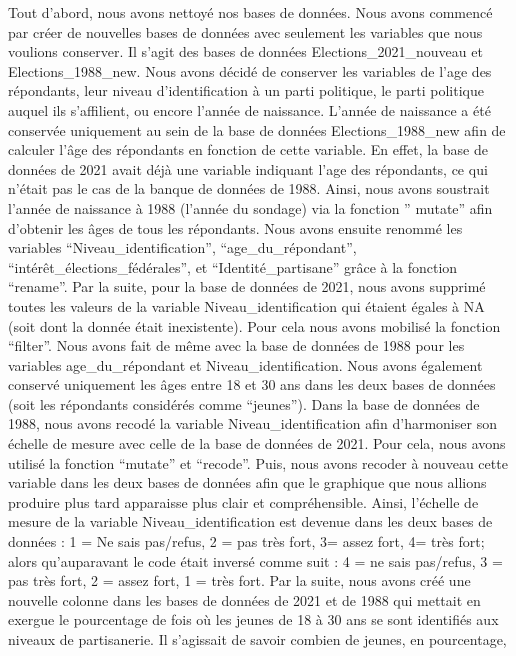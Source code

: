 \documentclass[
  letterpaper,
  DIV=11,
  numbers=noendperiod]{scrartcl}
\begin{document}
Tout d'abord, nous avons nettoyé nos bases de données. Nous avons
commencé par créer de nouvelles bases de données avec seulement les
variables que nous voulions conserver. Il s'agit des bases de données
Elections\_2021\_nouveau et Elections\_1988\_new. Nous avons décidé de
conserver les variables de l'age des répondants, leur niveau
d'identification à un parti politique, le parti politique auquel ils
s'affilient, ou encore l'année de naissance. L'année de naissance a été
conservée uniquement au sein de la base de données Elections\_1988\_new
afin de calculer l'âge des répondants en fonction de cette variable. En
effet, la base de données de 2021 avait déjà une variable indiquant
l'age des répondants, ce qui n'était pas le cas de la banque de données
de 1988. Ainsi, nous avons soustrait l'année de naissance à 1988
(l'année du sondage) via la fonction '' mutate'' afin d'obtenir les âges
de tous les répondants. Nous avons ensuite renommé les variables
``Niveau\_identification'', ``age\_du\_répondant'',
``intérêt\_élections\_fédérales'', et ``Identité\_partisane'' grâce à la
fonction ``rename''. Par la suite, pour la base de données de 2021, nous
avons supprimé toutes les valeurs de la variable Niveau\_identification
qui étaient égales à NA (soit dont la donnée était inexistente). Pour
cela nous avons mobilisé la fonction ``filter''. Nous avons fait de même
avec la base de données de 1988 pour les variables age\_du\_répondant et
Niveau\_identification. Nous avons également conservé uniquement les
âges entre 18 et 30 ans dans les deux bases de données (soit les
répondants considérés comme ``jeunes''). Dans la base de données de
1988, nous avons recodé la variable Niveau\_identification afin
d'harmoniser son échelle de mesure avec celle de la base de données de
2021. Pour cela, nous avons utilisé la fonction ``mutate'' et
``recode''. Puis, nous avons recoder à nouveau cette variable dans les
deux bases de données afin que le graphique que nous allions produire
plus tard apparaisse plus clair et compréhensible. Ainsi, l'échelle de
mesure de la variable Niveau\_identification est devenue dans les deux
bases de données : 1 = Ne sais pas/refus, 2 = pas très fort, 3= assez
fort, 4= très fort; alors qu'auparavant le code était inversé comme suit
: 4 = ne sais pas/refus, 3 = pas très fort, 2 = assez fort, 1 = très
fort. Par la suite, nous avons créé une nouvelle colonne dans les bases
de données de 2021 et de 1988 qui mettait en exergue le pourcentage de
fois où les jeunes de 18 à 30 ans se sont identifiés aux niveaux de
partisanerie. Il s'agissait de savoir combien de jeunes, en pourcentage,
\end{document}
